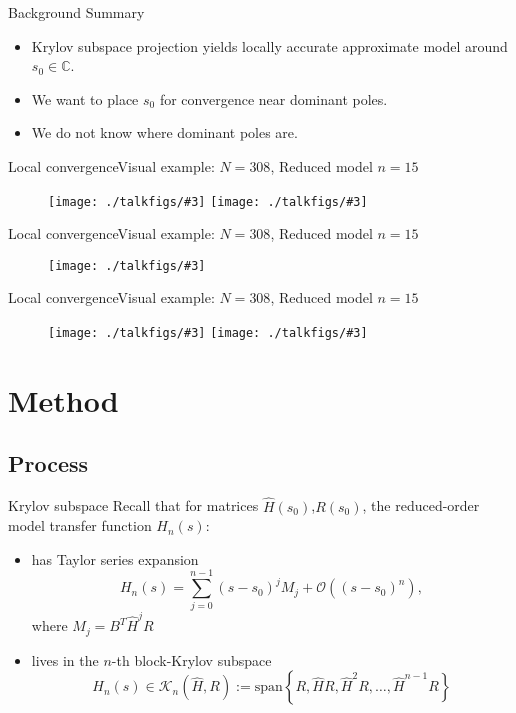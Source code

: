 \documentclass{beamer}
\newcommand{\C}{\mathbb{C}}
\newcommand{\A}{\widehat{H}}
\newcommand{\bigO}[1]{\mathcal{O}\left( #1 \right)}
\newcommand{\krylov}[3]{\mathcal{K}_{#1}\left({#2},{#3} \right)}
\theoremstyle{remark}
\newcommand{\putfig}[3][{}]{\texttt{[image: ./talkfigs/\#3]}} %
\begin{document}
\begin{frame}{Background Summary}  
    \begin{itemize}
    	\item Krylov subspace projection yields 
    	locally accurate approximate model around $s_0\in\C$.
    	\medskip
    	
    	\item We want to place $s_0$ for convergence near dominant poles. 
    	\medskip
    	
    	\item We do not know where dominant poles are. 
    \end{itemize}    
\end{frame}




\begin{frame}{Local convergence}{Visual example: $N=308$, Reduced model $n=15$}
	\begin{figure}[htbp]
		\centering
		\putfig{.48}{ex308s1_loc15_tfunc.png}\hfill
		\putfig{.50}{ex308s1_loc15_poles.png}
	\end{figure}
\end{frame}

\begin{frame}{Local convergence}{Visual example: $N=308$, Reduced model $n=15$}
	\begin{figure}[htbp]
		\centering
		\putfig{.85}{ex308s1_loc15_poles.png}
	\end{figure}
\end{frame}

\begin{frame}{Local convergence}{Visual example: $N=308$, Reduced model $n=15$}
	\begin{figure}[htbp]
		\centering
		\putfig{.70}{ex308s1_loc15_tfunc.png}\hfill
		\putfig{.30}{ex308s1_loc15_poles.png}
	\end{figure}
\end{frame}


\section{Method}

\subsection{Process}
\begin{frame}{Krylov subspace}{}
Recall that for matrices $\A(s_0)$,$R(s_0)$, the 
reduced-order model transfer function $H_n(s)$:
	\begin{itemize}
		\item  has Taylor series expansion
		\[
			H_n(s)= \sum_{j=0}^{n-1} (s-s_0)^jM_j + \bigO{(s-s_0)^n},
		\]	 
  		where $M_j =  B^T\A^j R$

		\bigskip
		\item lives in the $n$-th block-Krylov subspace
		\[
			H_n(s) \in \krylov{n}{\A}{R}:= \text{span}\left\{R,\A R,\A^2R,\ldots,\A^{n-1}R\right\}
		\]
	\end{itemize}
\end{frame}
\end{document}
